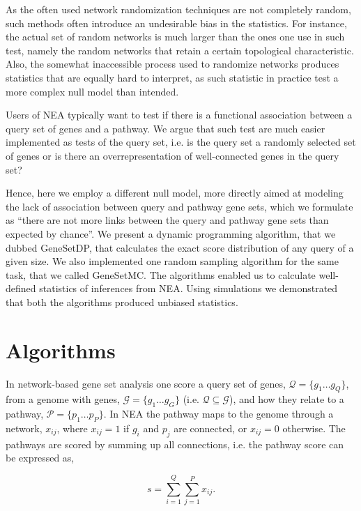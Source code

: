 \documentclass[10pt,letterpaper]{article}
\begin{document}
As the often used network randomization techniques are not completely random, such methods often introduce an undesirable bias in the statistics. For instance, the actual set of random networks is much larger than the ones one use in such test, namely the random networks that retain a certain topological characteristic\cite{newman2001random}. Also, the somewhat inaccessible process used to randomize networks produces statistics that are equally hard to interpret, as such statistic in practice test a more complex null model than intended.

Users of NEA typically want to test if there is a functional association between a query set of genes and a pathway\cite{alexeyenko2012network}. We argue that such test are much easier implemented as tests of the query set, i.e. is the query set a randomly selected set of genes or is there an overrepresentation of well-connected genes in the query set?

Hence, here we employ a different null model, more directly aimed at modeling the lack of association between query and pathway gene sets, which we formulate as ``there are not more links between the query and pathway gene sets than expected by chance''. We present a dynamic programming algorithm, that we dubbed GeneSetDP, that calculates the exact score distribution of any query of a given size. We also implemented one random sampling algorithm for the same task, that we called GeneSetMC.
The algorithms enabled us to calculate well-defined statistics of inferences from NEA.  Using simulations we demonstrated that both the algorithms produced unbiased statistics.

\section*{Algorithms}

In network-based gene set analysis one score a query set of genes, $ \mathcal{Q}=\{g_1 \ldots g_Q\}$, from a genome with genes, $\mathcal{G}=\{g_1 \ldots g_G\}$ (i.e. $\mathcal{Q} \subseteq \mathcal{G}$), and how they relate to a pathway, $\mathcal{P}=\{p_1 \ldots p_P\}$. In NEA the pathway maps to the genome through a network, ${x_{ij}}$, where $x_{ij}=1$ if $g_i$ and $p_j$ are connected, or $x_{ij}=0$ otherwise. The pathways are scored by summing up all connections, i.e. the pathway score can be expressed as,

\begin{equation}
s=\sum_{i=1}^Q\sum_{j=1}^P x_{ij}.
\label{eq:sum_ij}
\end{equation}
\end{document}
